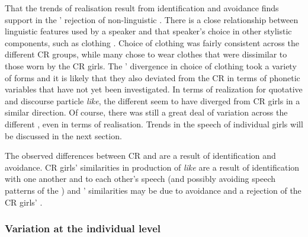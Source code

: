 That the trends of  realisation result from identification and avoidance finds support in the ' rejection of non-linguistic . There is a close relationship between linguistic features used by a speaker and that speaker's choice in other stylistic components, such as clothing \citep[89]{bourdieu1991}. Choice of clothing was fairly consistent across the different CR groups, while many  chose to wear clothes that were dissimilar to those worn by the CR girls. The ' divergence in choice of clothing took a variety of forms and it is likely that they also deviated from the CR  in terms of phonetic variables that have not yet been investigated. In terms of  realization for quotative and discourse particle \textit{like}, the different  seem to have diverged from CR girls in a similar direction. Of course, there was still a great deal of variation across the different , even in terms of  realisation. Trends in the speech of individual girls will be discussed in the next section.

The observed differences between CR and  are a result of identification and avoidance. CR girls' similarities in production of \textit{like} are a result of identification with one another and  to each other's speech (and possibly avoiding speech patterns of the ) and ' similarities may be due to avoidance and a rejection of the CR girls' .




\subsubsection{Variation at the individual level}\label{theindividual}

